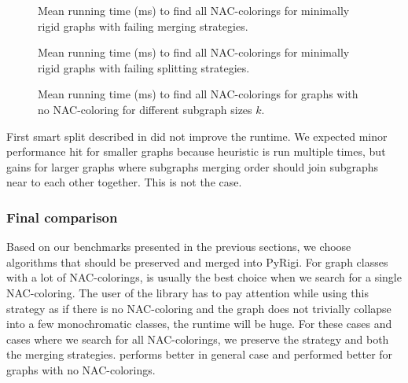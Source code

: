 \begin{figure}[p]
	\centering
	\scalebox{0.5}{}
	\caption[Mean runtime for minimally rigid graphs (some).]{
		Mean running time (ms) to find all NAC-colorings for minimally rigid graphs with failing merging strategies.}%
	\label{fig:graph_mimimally_rigid_failing_merging_first_runtime}
\end{figure}
\begin{figure}[p]
	\centering
	\scalebox{0.5}{}
	\caption[Mean runtime for minimally rigid graphs (some).]{
		Mean running time (ms) to find all NAC-colorings for minimally rigid graphs with failing splitting strategies.}%
	\label{fig:graph_mimimally_rigid_failing_split_first_runtime}
\end{figure}
\begin{figure}[p]
	\centering
	\scalebox{0.5}{}
	\caption[Mean runtime for minimally rigid graphs (some).]{
		Mean running time (ms) to find all NAC-colorings for graphs with no NAC-coloring for different subgraph sizes \( k \).}%
	\label{fig:graph_no_nac_coloring_generated_rigid_failing_merging_first_runtime}
\end{figure}

First smart split described in 
did not improve the runtime.
We expected minor performance hit for smaller graphs because heuristic is run
multiple times, but gains for larger graphs where subgraphs merging order
should join subgraphs near to each other together. This is not the case.


\subsubsection{Final comparison}

Based on our benchmarks presented in the previous sections,
we choose algorithms that should be preserved and merged into PyRigi.
For graph classes with a lot of NAC-colorings,
\NaiveCycles{} is usually the best choice
when we search for a single NAC-coloring.
The user of the library has to pay attention while using this strategy
as if there is no NAC-coloring and the graph does not trivially collapse
into a few monochromatic classes, the runtime will be huge.
For these cases and cases where we search for all NAC-colorings,
we preserve the \NeighborsDegree{} strategy and both the merging strategies.
\MergeLinear{} performs better in general case and
\SharedVertices{} performed better for graphs with no NAC-colorings.


